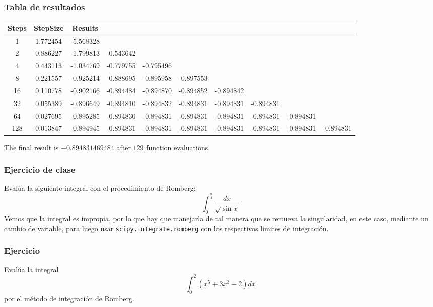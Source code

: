 \begin{frame}
\frametitle{Tabla de resultados}
\fontsize{6}{6}\selectfont
\begin{tabular}{c c c c c c c c c c}
 Steps	&	StepSize	&	Results	 \\ \hline							
     1	&	1.772454	&	-5.568328 \\ \hline 
     2	&	0.886227	&	-1.799813	&	-0.543642 \\ \hline
     4	&	0.443113	&	-1.034769	&	-0.779755	&	-0.795496 \\ \hline
     8	&	0.221557	&	-0.925214	&	-0.888695	&	-0.895958	&	-0.897553 \\ \hline
    16	&	0.110778	&	-0.902166	&	-0.894484	&	-0.894870	&	-0.894852	&	-0.894842 \\ \hline
    32	&	0.055389	&	-0.896649	&	-0.894810	&	-0.894832	&	-0.894831	&	-0.894831	&	-0.894831 \\ \hline
    64	&	0.027695	&	-0.895285	&	-0.894830	&	-0.894831	&	-0.894831	&	-0.894831	&	-0.894831	&	-0.894831 \\ \hline
   128	&	0.013847	&	-0.894945	&	-0.894831	&	-0.894831	&	-0.894831	&	-0.894831	&	-0.894831	&	-0.894831	&	-0.894831 
\end{tabular}
\fontsize{12}{12}\selectfont
The final result is $-0.894831469484$ after $129$ function evaluations.
\end{frame}
\begin{frame}
\frametitle{Ejercicio de clase}
Eval\'{u}a la siguiente integral con el procedimiento de Romberg:
\[ \int_{0}^{\frac{\pi}{4}} \dfrac{dx}{\sqrt{\sin x}} \]
Vemos que la integral es impropia, por lo que hay que manejarla de tal manera que se remueva la singularidad, en este caso, mediante un cambio de variable, para luego usar \texttt{scipy.integrate.romberg} con los respectivos l\'{i}mites de integraci\'{o}n.
\end{frame}
\begin{frame}
\frametitle{Ejercicio}
Eval\'{u}a la integral
\[ \int_{0}^{2} (x^{5} + 3 x^{3} - 2) dx\]
por el m\'{e}todo de integraci\'{o}n de Romberg.
\end{frame}
